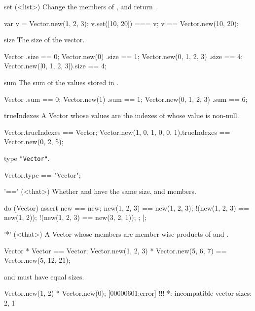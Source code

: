 \begin{urbiscriptapi}
\item[set](<list>)%
  Change the members of \this, and return \this.
\begin{urbiassert}
var v = Vector.new(1, 2, 3);
v.set([10, 20]) === v;
v == Vector.new(10, 20);
\end{urbiassert}

\item[size]%
  The size of the vector.
\begin{urbiassert}
Vector                  .size == 0;
Vector.new(0)           .size == 1;
Vector.new(0, 1, 2, 3)  .size == 4;
Vector.new([0, 1, 2, 3]).size == 4;
\end{urbiassert}

\item[sum]%
  The sum of the values stored in \this.
\begin{urbiassert}
Vector                  .sum == 0;
Vector.new(1)           .sum == 1;
Vector.new(0, 1, 2, 3)  .sum == 6;
\end{urbiassert}

\item[trueIndexes]%
  A Vector whose values are the indexes of \this whose value is non-null.
\begin{urbiassert}
Vector.trueIndexes == Vector;
Vector.new(1, 0, 1, 0, 0, 1).trueIndexes == Vector.new(0, 2, 5);
\end{urbiassert}

\item[type]%
  \lstinline|"Vector"|.
\begin{urbiassert}
Vector.type == "Vector";
\end{urbiassert}

\item['=='](<that>)%
  Whether \this and \that have the same size, and members.
\begin{urbiscript}
do (Vector)
{
  assert
  {
               new == new;
      new(1, 2, 3) == new(1, 2, 3);
    !(new(1, 2, 3) == new(1, 2));
    !(new(1, 2, 3) == new(3, 2, 1));
  };
}|;
\end{urbiscript}

\item['*'](<that>)%
  A Vector whose members are member-wise products of \this and \that.
\begin{urbiassert}
Vector              * Vector              == Vector;
Vector.new(1, 2, 3) * Vector.new(5, 6, 7) == Vector.new(5, 12, 21);
\end{urbiassert}
  \this and \that must have equal sizes.
\begin{urbiscript}
Vector.new(1, 2) * Vector.new(0);
[00000601:error] !!! *: incompatible vector sizes: 2, 1
\end{urbiscript}


\end{urbiscriptapi}
